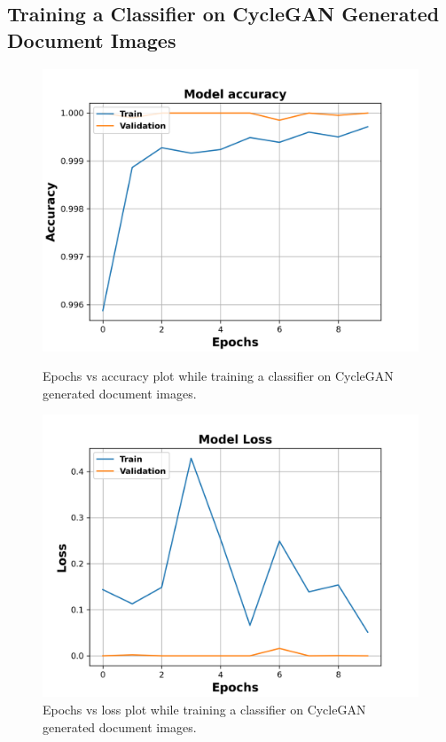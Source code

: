 \subsection{Training a Classifier on \ac{CycleGAN} Generated Document Images}




\begin{figure}[H]
  \centering
  \begin{minipage}[b]{0.45\textwidth}
    \includegraphics[width=\textwidth]{images/Evaluation/CycleGAN_Generated_Data_Classifier_2021-06-02_21-55-39_Accuracy.png}
    \caption[Epochs vs accuracy plot while training a classifier on \ac{CycleGAN} generated document images.]{Epochs vs accuracy plot while training a classifier  on \ac{CycleGAN} generated document images.}
    \label{fig:SyntheticClassifierAcc}
  \end{minipage}
  \hfill
  \begin{minipage}[b]{0.45\textwidth}
    \includegraphics[width=\textwidth]{images/Evaluation/CycleGAN_Generated_Data_Classifier_2021-06-02_21-55-39_Loss.png}
    \caption[Epochs vs loss plot while training a classifier on \ac{CycleGAN} generated document images.]{Epochs vs loss plot while training a classifier on \ac{CycleGAN} generated document images.}
    \label{fig:SyntheticClassifierLoss}
  \end{minipage}
\end{figure}



